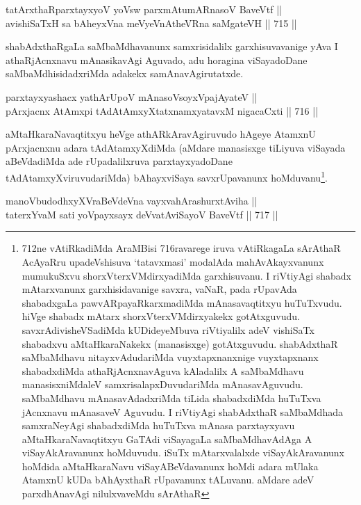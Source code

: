 \begin{shl}
tatArxthaRparxtayxyoV yoV\s sw parxmAtumARnasoV BaveVtf || \\
avishiSaTxH sa bAheyxVna meVyeVnAtheVRna saMgateVH \hfill || 715 ||  
\end{shl}

\begin{artha} 
shabAdxthaRgaLa saMbaMdhavanunx samxrisidalilx garxhisuvavanige yAva I 
athaRjAcnxnavu mAnasikavAgi Aguvado, adu horagina viSayadoDane 
saMbaMdhisidadxriMda adakekx samAnavAgirutatxde.
\end{artha}

\begin{shl}
parxtayxyashacx yathArUpoV mAnasoV\s soyxVpajAyateV || \\
pArxjacnx AtAmx\s pi tAdAtAmxyXtatxnamxyatavxM nigacaCxti \hfill || 716 ||  
\end{shl}

\begin{artha} 
aMtaHkaraNavaqtitxyu heVge athARkAravAgiruvudo hAgeye AtamxnU 
pArxjacnxnu adara tAdAtamxyXdiMda (aMdare manasisxge tiLiyuva viSayada 
aBeVdadiMda ade rUpadalilxruva parxtayxyadoDane 
tAdAtamxyXviruvudariMda) bAhayxviSaya savxrUpavanunx 
hoMduvanu\footnote{712ne vAtiRkadiMda AraMBisi 716ravarege iruva 
vAtiRkagaLa sArAthaR \ndash  AcAyaRru upadeVshisuva `tatavxmasi' modalAda 
mahAvAkayxvanunx mumukuSxvu shorxVterxVMdirxyadiMda garxhisuvanu. I 
riVtiyAgi shabadx mAtarxvanunx garxhisidavanige savxra, vaNaR, pada 
rUpavAda shabadxgaLa pawvARpayaRkarxmadiMda mAnasavaqtitxyu 
huTuTxvudu. hiVge shabadx mAtarx shorxVterxVMdirxyakekx gotAtxguvudu. 
savxrAdivisheVSadiMda kUDideyeMbuva riVtiyalilx adeV vishiSaTx 
shabadxvu aMtaHkaraNakekx (manasisxge) gotAtxguvudu. shabAdxthaR 
saMbaMdhavu nitayxvAdudariMda vuyxtapxnanxnige vuyxtapxnanx 
shabadxdiMda athaRjAcnxnavAguva kAladalilx A saMbaMdhavu 
manasisxniMdaleV samxrisalapxDuvudariMda mAnasavAguvudu. saMbaMdhavu 
mAnasavAdadxriMda tiLida shabadxdiMda huTuTxva jAcnxnavu mAnasaveV 
Aguvudu. I riVtiyAgi shabAdxthaR saMbaMdhada samxraNeyAgi shabadxdiMda 
huTuTxva mAnasa parxtayxyavu aMtaHkaraNavaqtitxyu GaTAdi viSayagaLa 
saMbaMdhavAdAga A viSayAkAravanunx hoMduvudu. iSuTx mAtarxvalalxde 
viSayAkAravanunx hoMdida aMtaHkaraNavu viSayABeVdavanunx hoMdi adara 
mUlaka AtamxnU kUDa bAhAyxthaR rUpavanunx tALuvanu. aMdare adeV 
parxdhAnavAgi nilulxvaveMdu sArAthaR \ndash }.
\end{artha}

\begin{shl}
manoVbudodhxyXVraBeVdeVna vayxvahArashurxtAviha || \\
taterxYvaM sati yoVpayxsayx deVvatAviSayoV BaveVtf \hfill || 717 ||  
\end{shl}
				
